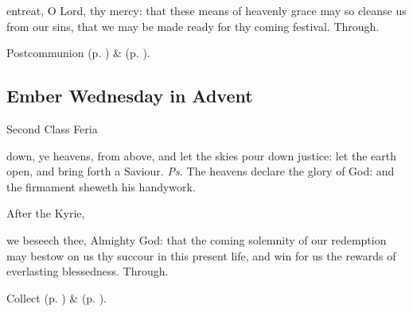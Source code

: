 
\postcommunion
{} entreat, O Lord, thy mercy: that these means of heavenly grace may so cleanse us from our sins, that we may be made ready for thy coming festival. Through.
\begin{rubric}
     Postcommunion  (p. \pageref{AdventIPostcommunion}) \&   (p. \pageref{SPMaryInAdvent}).
\end{rubric}


\subsection{Ember Wednesday in Advent}
\begin{inhead}
{Second Class Feria}
\end{inhead}


\introit
{} down, ye heavens, from above, and let the skies pour down justice: let the earth open, and bring forth a Saviour. \textit{Ps.} The heavens declare the glory of God: and the firmament sheweth his handywork.
\begin{rubric}
    After the Kyrie,
\end{rubric}
\collect
{} we beseech thee, Almighty God: that the coming solemnity of our redemption may bestow on us thy succour in this present life, and win for us the rewards of everlasting blessedness. Through.

\begin{rubric}
     Collect  (p. \pageref{AdventICollect}) \&   (p. \pageref{SPMaryInAdvent}).
\end{rubric}

